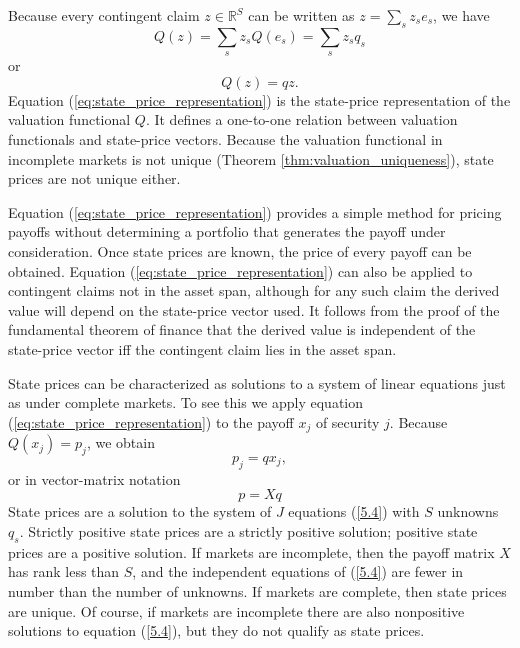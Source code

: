 \documentclass[\topdir/lecture\_notes.tex]{subfiles}
\begin{document}
Because every contingent claim \(z \in \mathbb{R}^{S}\) can be written as \(z=\sum_{s} z_{s} e_{s}\), we have
\begin{equation}
Q(z)=\sum_{s} z_{s} Q(e_{s})=\sum_{s} z_{s} q_{s} 
\end{equation}
or
\begin{equation}
Q(z)=q z. \label{eq:state_price_representation} 
\end{equation}
Equation (\ref{eq:state_price_representation}) is the state-price representation of the valuation functional \(Q\). It defines a one-to-one relation between valuation functionals and state-price vectors. Because the valuation functional in incomplete markets is not unique (Theorem \ref{thm:valuation_uniqueness}), state prices are not unique either.

Equation (\ref{eq:state_price_representation}) provides a simple method for pricing payoffs without determining a portfolio that generates the payoff under consideration. Once state prices are known, the price of every payoff can be obtained. Equation (\ref{eq:state_price_representation}) can also be applied to contingent claims not in the asset span, although for any such claim the derived value will depend on the state-price vector used. It follows from the proof of the fundamental theorem of finance that the derived value is independent of the state-price vector iff the contingent claim lies in the asset span.

State prices can be characterized as solutions to a system of linear equations just as under complete markets. To see this we apply equation (\ref{eq:state_price_representation}) to the payoff \(x_{j}\) of security \(j\). Because \(Q(x_{j})=p_{j}\), we obtain
\begin{equation}
p_{j}=q x_{j}, \label{5.2}
\end{equation}
or in vector-matrix notation
\begin{equation}
p=X q \label{5.4}
\end{equation}
State prices are a solution to the system of \(J\) equations (\ref{5.4}) with \(S\) unknowns \(q_{s}\). Strictly positive state prices are a strictly positive solution; positive state prices are a positive solution. If markets are incomplete, then the payoff matrix \(X\) has rank less than \(S\), and the independent equations of (\ref{5.4}) are fewer in number than the number of unknowns. If markets are complete, then state prices are unique. Of course, if markets are incomplete there are also nonpositive solutions to equation (\ref{5.4}), but they do not qualify as state prices.
\end{document}
